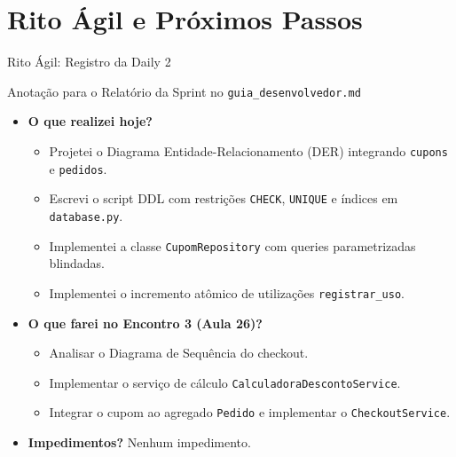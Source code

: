 \documentclass[10pt]{beamer}
\begin{document}
\section{Rito Ágil e Próximos Passos}

\begin{frame}{Rito Ágil: Registro da Daily 2}
    \begin{block}{Anotação para o Relatório da Sprint no \texttt{guia\_desenvolvedor.md}}
    \begin{itemize}
        \item \textbf{O que realizei hoje?}
        \begin{itemize}
            \item Projetei o Diagrama Entidade-Relacionamento (DER) integrando \texttt{cupons} e \texttt{pedidos}.
            \item Escrevi o script DDL com restrições \texttt{CHECK}, \texttt{UNIQUE} e índices em \texttt{database.py}.
            \item Implementei a classe \texttt{CupomRepository} com queries parametrizadas blindadas.
            \item Implementei o incremento atômico de utilizações \texttt{registrar\_uso}.
        \end{itemize}
        \item \textbf{O que farei no Encontro 3 (Aula 26)?}
        \begin{itemize}
            \item Analisar o Diagrama de Sequência do checkout.
            \item Implementar o serviço de cálculo \texttt{CalculadoraDescontoService}.
            \item Integrar o cupom ao agregado \texttt{Pedido} e implementar o \texttt{CheckoutService}.
        \end{itemize}
        \item \textbf{Impedimentos?} Nenhum impedimento.
    \end{itemize}
    \end{block}
\end{frame}
\end{document}
